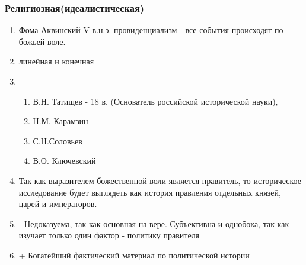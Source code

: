 \documentclass[a4paper]{article}
\begin{document}
\subsubsection{Религиозная(идеалистическая)}
\begin{enumerate}
    \item Фома Аквинский V в.н.э.
    провиденциализм - все события происходят по божьей воле.
    \item линейная и конечная
    \item
    \begin{enumerate}
        \item В.Н. Татищев - 18 в. (Основатель российской исторической науки),
        \item Н.М. Карамзин
        \item С.Н.Соловьев
        \item В.О. Ключевский
    \end{enumerate}
    \item Так как выразителем божественной воли является правитель, то историческое исследование будет выглядеть как история правления отдельных князей, царей и императоров.
    \item - Недоказуема, так как основная на вере. Субъективна и однобока, так как изучает только один фактор - политику правителя
    \item + Богатейший фактический материал по политической истории
\end{enumerate}
\end{document}
